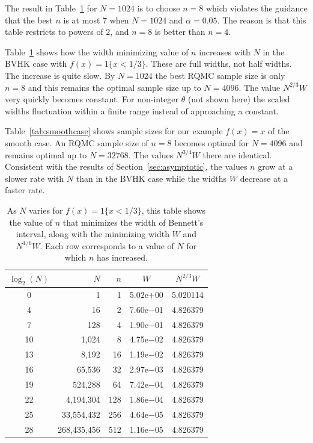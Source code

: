 \documentclass{article}
\newcommand{\art}[1]{\begingroup\color{blue}#1\endgroup}
\newcommand{\phz}{\phantom{0}}
\begin{document}
\art{The result in Table~\ref{tab:bvhkcase} for $N=1024$
is to choose $n=8$ which violates the guidance that
the best $n$ is at most $7$ when $N=1024$ and $\alpha=0.05$. 
The reason is that this
table restricts to powers of $2$, and $n=8$ is better
than $n=4$.
}

Table~\ref{tab:bvhkcase} shows how the width
minimizing value of $n$ increases with $N$ in the BVHK
case \art{with $f(x) = 1\{x<1/3\}$.}
These are full widths, not half widths.
The increase is quite slow. By $N=1024$
the best RQMC sample size is only $n=8$
and this remains the optimal sample size up to $N=4096$.
The value $N^{2/3}W$ very quickly becomes constant.
\art{For non-integer $\theta$ (not shown here) the
scaled widths fluctuation within a finite range
instead of approaching a constant.}

Table~\ref{tab:smoothcase} shows \art{sample sizes for our example 
$f(x)=x$ of the smooth case.}  
An RQMC sample size of $n=8$ becomes
optimal for $N=4096$ and remains optimal up
to $N=32768$.  The values $N^{3/4}W$
there are identical. Consistent with the results of
Section~\ref{sec:asymptotic}, the values $n$
grow at a slower rate with $N$ than in the
BVHK case while the widths $W$ decrease at
a faster rate.



\begin{table}[t]\centering
\begin{tabular}{crrcc}
\toprule
   $\log_2(N)$&        $N$ &  $n$ & $W$ & $N^{2/3}W$\\
   \midrule
   \phz0&         1&   1& 5.02e$+$00 &5.020114\\
   \phz4&        16&   2& 7.60e$-$01 &4.826379\\
   \phz7&       128&   4& 1.90e$-$01 &4.826379\\
  10&      1,024&   8& 4.75e$-$02 &4.826379\\
  13&      8,192&  16& 1.19e$-$02 &4.826379\\
  16&     65,536&  32& 2.97e$-$03 &4.826379\\
  19&    524,288&  64& 7.42e$-$04 &4.826379\\
  22&   4,194,304& 128& 1.86e$-$04 &4.826379\\
  25&  33,554,432& 256& 4.64e$-$05 &4.826379\\
  28& 268,435,456& 512& 1.16e$-$05 &4.826379\\
 \bottomrule
\end{tabular}
\caption{\label{tab:bvhkcase}
As $N$ varies for $f(x)=1\{x<1/3\}$, this table shows the
value of $n$ that minimizes the width of Bennett's
interval, along with the minimizing width $W$
and $N^{1/6}W$. Each row corresponds to a value of $N$
for which $n$ has increased.}
\end{table}
\end{document}
